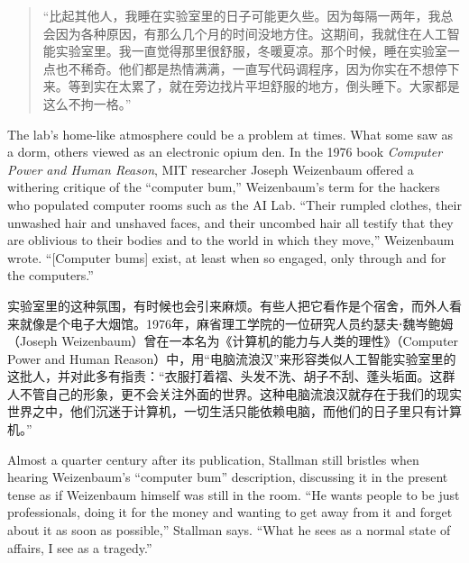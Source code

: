 \ifdefined\chs
\begin{quote}
``比起其他人，我睡在实验室里的日子可能更久些。因为每隔一两年，我总会因为各种原因，有那么几个月的时间没地方住。这期间，我就住在人工智能实验室里。我一直觉得那里很舒服，冬暖夏凉。那个时候，睡在实验室一点也不稀奇。他们都是热情满满，一直写代码调程序，因为你实在不想停下来。等到实在太累了，就在旁边找片平坦舒服的地方，倒头睡下。大家都是这么不拘一格。''
\end{quote}
\fi

\ifdefined\eng
The lab's home-like atmosphere could be a problem at times. What some saw as a dorm, others viewed as an electronic opium den. In the 1976 book \textit{Computer Power and Human Reason}, MIT researcher Joseph Weizenbaum offered a withering critique of the ``computer bum,'' Weizenbaum's term for the hackers who populated computer rooms such as the AI Lab. ``Their rumpled clothes, their unwashed hair and unshaved faces, and their uncombed hair all testify that they are oblivious to their bodies and to the world in which they move,'' Weizenbaum wrote. ``[Computer bums] exist, at least when so engaged, only through and for the computers.''
\fi

\ifdefined\chs
实验室里的这种氛围，有时候也会引来麻烦。有些人把它看作是个宿舍，而外人看来就像是个电子大烟馆。1976年，麻省理工学院的一位研究人员约瑟夫⋅魏岑鲍姆（Joseph Weizenbaum）曾在一本名为《计算机的能力与人类的理性》（Computer Power and Human Reason）中，用``电脑流浪汉''来形容类似人工智能实验室里的这批人，并对此多有指责：``衣服打着褶、头发不洗、胡子不刮、蓬头垢面。这群人不管自己的形象，更不会关注外面的世界。这种电脑流浪汉就存在于我们的现实世界之中，他们沉迷于计算机，一切生活只能依赖电脑，而他们的日子里只有计算机。''
\fi

\ifdefined\eng
Almost a quarter century after its publication, Stallman still bristles when hearing Weizenbaum's ``computer bum'' description, discussing it in the present tense as if Weizenbaum himself was still in the room. ``He wants people to be just professionals, doing it for the money and wanting to get away from it and forget about it as soon as possible,'' Stallman says. ``What he sees as a normal state of affairs, I see as a tragedy.''
\fi

